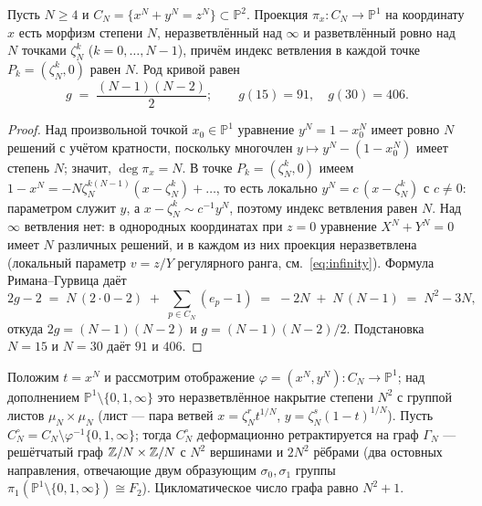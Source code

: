 \begin{lemma}\label{lem:genus}
Пусть $N\ge 4$ и $C_N=\{x^N+y^N=z^N\}\subset\mathbb{P}^2$. Проекция
$\pi_x\colon C_N\to\mathbb{P}^1$ на координату $x$ есть морфизм степени
$N$, неразветвлённый над $\infty$ и разветвлённый ровно над $N$ точками
$\zeta_N^k$ ($k=0,\dots,N-1$), причём индекс ветвления в каждой точке
$P_k=(\zeta_N^k,0)$ равен $N$. Род кривой равен
\[
  g \;=\; \frac{(N-1)(N-2)}{2};
  \qquad
  g(15)=91,\quad g(30)=406 .
\]
\end{lemma}

\begin{proof}
Над произвольной точкой $x_0\in\mathbb{P}^1$ уравнение
$y^N=1-x_0^N$ имеет ровно $N$ решений с учётом кратности, поскольку
многочлен $y\mapsto y^N-(1-x_0^N)$ имеет степень $N$; значит,
$\deg\pi_x=N$. В точке $P_k=(\zeta_N^k,0)$ имеем
$1-x^N=-N\zeta_N^{k(N-1)}(x-\zeta_N^k)+\dots$, то есть локально
$y^N=c\,(x-\zeta_N^k)$ с $c\ne0$: параметром служит $y$, а
$x-\zeta_N^k\sim c^{-1}y^N$, поэтому индекс ветвления равен $N$.
Над $\infty$ ветвления нет: в однородных координатах при $z=0$
уравнение $X^N+Y^N=0$ имеет $N$ различных решений, и в каждом из них
проекция неразветвлена (локальный параметр $v=z/Y$ регулярного ранга,
см.~\eqref{eq:infinity}). Формула Римана--Гурвица даёт
\[
  2g-2 \;=\; N\,(2\cdot 0-2) \;+\; \sum_{p\in C_N}(e_p-1)
  \;=\; -2N \;+\; N\,(N-1) \;=\; N^2-3N,
\]
откуда $2g=(N-1)(N-2)$ и $g=(N-1)(N-2)/2$. Подстановка $N=15$ и
$N=30$ даёт $91$ и $406$.
\end{proof}

\begin{lemma}\label{lem:gridgraph}
Положим $t=x^N$ и рассмотрим отображение
$\varphi=(x^N,y^N)\colon C_N\to\mathbb{P}^1$; над дополнением
$\mathbb{P}^1\setminus\{0,1,\infty\}$ это неразветвлённое накрытие
степени $N^2$ с группой листов $\mu_N\times\mu_N$ (лист --- пара
ветвей $x=\zeta_N^r t^{1/N}$, $y=\zeta_N^s(1-t)^{1/N}$). Пусть
$C_N^\circ=C_N\setminus\varphi^{-1}\{0,1,\infty\}$; тогда $C_N^\circ$
деформационно ретрактируется на граф $\Gamma_N$ --- решётчатый граф
$\mathbb{Z}/N\times\mathbb{Z}/N$ с $N^2$ вершинами и $2N^2$ рёбрами (два остовных
направления, отвечающие двум образующим $\sigma_0,\sigma_1$ группы
$\pi_1(\mathbb{P}^1\setminus\{0,1,\infty\})\cong F_2$).
Цикломатическое число графа равно $N^2+1$.
\end{lemma}

